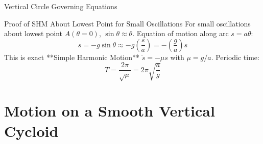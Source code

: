\begin{theorembox}{Vertical Circle Governing Equations}
\begin{center}
\end{center}
\end{theorembox}

\begin{proofbox}{Proof of SHM About Lowest Point for Small Oscillations}
For small oscillations about lowest point $A(\theta = 0)$, $\sin\theta \approx \theta$.
Equation of motion along arc $s = a\theta$:
\[
\ddot{s} = -g \sin\theta \approx -g \left(\frac{s}{a}\right) = -\left(\frac{g}{a}\right) s
\]
This is exact **Simple Harmonic Motion** $\ddot{s} = -\mu s$ with $\mu = g/a$. Periodic time:
\begin{equation}
T = \frac{2\pi}{\sqrt{\mu}} = 2\pi \sqrt{\frac{a}{g}}
\end{equation}
\end{proofbox}

\section{Motion on a Smooth Vertical Cycloid}

